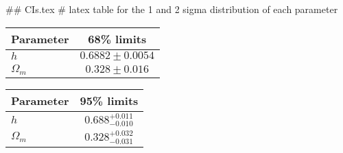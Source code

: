 ## CIs.tex
# latex table for the 1 and 2 sigma distribution of each parameter

\begin{tabular} { l  c}
 Parameter &  68\% limits\\
\hline
{\boldmath$h              $} & $0.6882\pm 0.0054          $\\
{\boldmath$\Omega_m       $} & $0.328\pm 0.016            $\\
\hline
\end{tabular}

\begin{tabular} { l  c}
 Parameter &  95\% limits\\
\hline
{\boldmath$h              $} & $0.688^{+0.011}_{-0.010}   $\\
{\boldmath$\Omega_m       $} & $0.328^{+0.032}_{-0.031}   $\\
\hline
\end{tabular}
